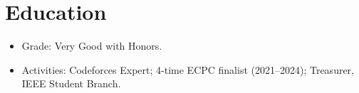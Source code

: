 \documentclass[10pt]{article}
\begin{document}
\section*{Education}
\begin{itemize}
  \item Grade: Very Good with Honors.
  \item Activities: Codeforces Expert; 4-time ECPC finalist (2021--2024); Treasurer, IEEE Student Branch.
\end{itemize}
\end{document}

